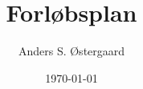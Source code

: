 \usepackage[utf8]{inputenc}
\usepackage[T1]{fontenc}
\usepackage{amsmath,amssymb}
\usepackage{pgfplots}
\usepackage{tikz}
\usepackage{lmodern}
\usepackage{graphicx}
\usepackage{hyperref}
\usepackage{listings}
\usepackage{enumitem}
\usepackage{fancyhdr}
\usepackage{lastpage}
\usepackage[left=2.5cm,right=2.5cm,top=2.5cm,bottom=2.5cm]{geometry}
\usepackage{hyperref}
\usepackage{nameref}

\pagestyle{fancy}
\fancyhf{}
\renewcommand{\headrulewidth}{0pt}

\title{Forløbsplan}
\author{Anders S. Østergaard}
\date{\today}
